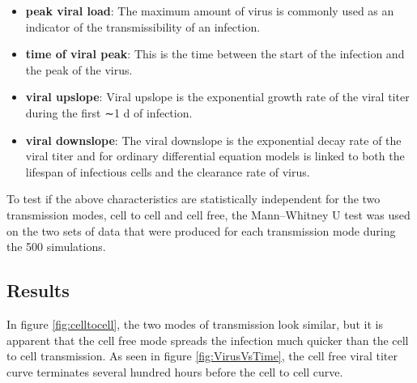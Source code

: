 \documentclass[a4paper]{article}
\begin{document}
\begin{itemize}
    \item \textbf{peak viral load}: The maximum amount of virus is commonly used as an indicator of the transmissibility of an infection.
    \item \textbf{time of viral peak}: This is the time between the start of the infection and the peak of the virus.
    \item \textbf{viral upslope}: Viral upslope is the exponential growth rate of the viral titer during the first ∼1 d of infection.
    \item \textbf{viral downslope}: The viral downslope is the exponential decay rate of the viral titer and for ordinary differential equation models is linked to both the lifespan of infectious cells and the clearance rate of virus.
\end{itemize}

\noindent
To test if the above characteristics are statistically independent for the two transmission modes, cell to cell and cell free, the Mann–Whitney U test was used on the two sets of data that were produced for each transmission mode during the 500 simulations.

\subsection{Results}
In figure \ref{fig:celltocell}, the two modes of transmission look similar, but it is apparent that the cell free mode spreads the infection much quicker than the cell to cell transmission. As seen in figure \ref{fig:VirusVsTime}, the cell free viral titer curve terminates several hundred hours before the cell to cell curve.

\end{document}
